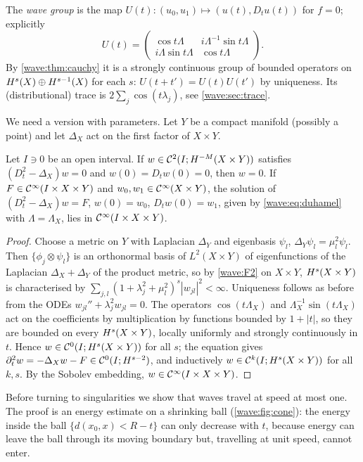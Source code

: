 The \emph{wave group} is the map
$U(t)\colon(u_0,u_1)\mapsto(u(t),D_tu(t))$ for $f=0$; explicitly
\begin{equation*}
U(t)=\begin{pmatrix}\cos t\Lambda&i\Lambda^{-1}\sin t\Lambda\\ i\Lambda\sin t\Lambda&\cos t\Lambda\end{pmatrix}.
\end{equation*}
By \cref{wave:thm:cauchy} it is a strongly continuous group of bounded operators
on $H^{s}(X)\oplus H^{s-1}(X)$ for each $s$: $U(t+t')=U(t)U(t')$ by
uniqueness. Its (distributional) trace is $2\sum_j\cos(t\lambda_j)$, see
\cref{wave:sec:trace}.

We need a version with parameters. Let $Y$ be a compact manifold (possibly a
point) and let $\Delta_X$ act on the first factor of $X\times Y$.

\begin{proposition}\label{wave:prop:param}
Let $I\ni0$ be an open interval. If $w\in\mathcal C^2(I;H^{-M}(X\times Y))$
satisfies $(D_t^2-\Delta_X)w=0$ and $w(0)=D_tw(0)=0$, then $w=0$. If
$F\in\mathcal{C}^\infty(I\times X\times Y)$ and $w_0,w_1\in\mathcal{C}^\infty(X\times Y)$, the solution of
$(D_t^2-\Delta_X)w=F$, $w(0)=w_0$, $D_tw(0)=w_1$, given by
\eqref{wave:eq:duhamel} with $\Lambda=\Lambda_X$, lies in $\mathcal{C}^\infty(I\times X\times Y)$.
\end{proposition}
\begin{proof}
Choose a metric on $Y$ with Laplacian $\Delta_Y$ and eigenbasis $\psi_l$,
$\Delta_Y\psi_l=\mu_l^2\psi_l$. Then $\{\phi_j\otimes\psi_l\}$ is an orthonormal
basis of $L^2(X\times Y)$ of eigenfunctions of the Laplacian
$\Delta_X+\Delta_Y$ of the product metric, so by \ref{wave:F2} on $X\times Y$,
$H^{s}(X\times Y)$ is characterised by
$\sum_{j,l}(1+\lambda_j^2+\mu_l^2)^s|w_{jl}|^2<\infty$. Uniqueness follows as
before from the ODEs $w_{jl}''+\lambda_j^2w_{jl}=0$. The operators $\cos(t\Lambda_X)$
and $\Lambda_X^{-1}\sin(t\Lambda_X)$ act on the coefficients by multiplication by
functions bounded by $1+|t|$, so they are bounded on every $H^{s}(X\times Y)$,
locally uniformly and strongly continuously in $t$. Hence
$w\in\mathcal{C}^0(I;H^{s}(X\times Y))$ for all $s$; the equation gives
$\partial_t^2w=-\Delta_Xw-F\in\mathcal{C}^0(I;H^{s-2})$, and inductively
$w\in\mathcal C^k(I;H^{s}(X\times Y))$ for all $k,s$. By the Sobolev
embedding, $w\in\mathcal{C}^\infty(I\times X\times Y)$.
\end{proof}

Before turning to singularities we show that waves travel at speed at most one.
The proof is an energy estimate on a shrinking ball (\cref{wave:fig:cone}): the energy
inside the ball $\{d(x_0,x)<R-t\}$ can only decrease with $t$, because energy can leave
the ball through its moving boundary but, travelling at unit speed, cannot enter.

